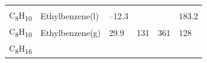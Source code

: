 \documentclass[
  9pt,
]{extbook}
\theoremstyle{definition}
\theoremstyle{definition}
\theoremstyle{definition}
\theoremstyle{remark}
\begin{document}
\begin{longtable}[]{@{}llllll@{}}
\begin{minipage}[t]{0.15\columnwidth}
\strut
\end{minipage} & \begin{minipage}[t]{0.14\columnwidth}\raggedright
\strut
\end{minipage} & \begin{minipage}[t]{0.14\columnwidth}\raggedright
\strut
\end{minipage}\tabularnewline
\begin{minipage}[t]{0.07\columnwidth}\raggedright
C\textsubscript{8}H\textsubscript{10}\strut
\end{minipage} & \begin{minipage}[t]{0.17\columnwidth}\raggedright
Ethylbenzene(l)\strut
\end{minipage} & \begin{minipage}[t]{0.15\columnwidth}\raggedright
--12.3\strut
\end{minipage} & \begin{minipage}[t]{0.15\columnwidth}\raggedright
\strut
\end{minipage} & \begin{minipage}[t]{0.14\columnwidth}\raggedright
\strut
\end{minipage} & \begin{minipage}[t]{0.14\columnwidth}\raggedright
183.2\strut
\end{minipage}\tabularnewline
\begin{minipage}[t]{0.07\columnwidth}\raggedright
C\textsubscript{8}H\textsubscript{10}\strut
\end{minipage} & \begin{minipage}[t]{0.17\columnwidth}\raggedright
Ethylbenzene(g)\strut
\end{minipage} & \begin{minipage}[t]{0.15\columnwidth}\raggedright
29.9\strut
\end{minipage} & \begin{minipage}[t]{0.15\columnwidth}\raggedright
131\strut
\end{minipage} & \begin{minipage}[t]{0.14\columnwidth}\raggedright
361\strut
\end{minipage} & \begin{minipage}[t]{0.14\columnwidth}\raggedright
128\strut
\end{minipage}\tabularnewline
\begin{minipage}[t]{0.07\columnwidth}\raggedright
C\textsubscript{8}H\textsubscript{16}\strut
\end{minipage} & \begin{minipage}[t]{0.17\columnwidth}\raggedright

\end{minipage}
\end{longtable}
\end{document}
